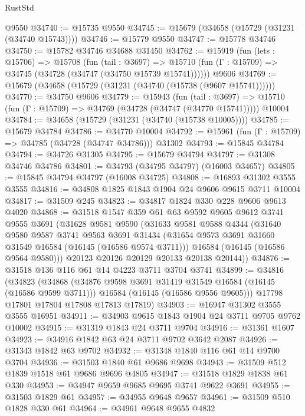 \begin{lexlean}{RustStd}
\begin{coremodule}
    @9550
@34740 := @15735 @9550
@34745 := @15679 (@34658 (@15729 (@31231 (@34740 @15743))))
@34746 := @15779 @9550
@34747 := @15778 @34746
@34750 := @15782 @34746 @34688 @31450
@34762 := @15919
    (fun (lets : @15706) =>
    @15708
      (fun (tail : @3697) =>
      @15710 (fun (Γ : @15709) => @34745 (@34728 (@34747 (@34750 @15739 @15741))))))
    @9606
@34769 := @15679 (@34658 (@15729 (@31231 (@34740 (@15738 (@9607 @15741))))))
@34770 := @34750 @9606
@34779 := @15943
    (fun (tail : @3697) => @15710 (fun (Γ : @15709) => @34769 (@34728 (@34747 (@34770 @15741)))))
    @10004
@34784 := @34658 (@15729 (@31231 (@34740 (@15738 @10005))))
@34785 := @15679 @34784
@34786 := @34770 @10004
@34792 := @15961 (fun (Γ : @15709) => @34785 (@34728 (@34747 @34786))) @31302
@34793 := @15845 @34784
@34794 := @34726 @31305
@34795 := @15679 @34794
@34797 := @31308 @34746 @34786
@34801 := @34793 (@34795 @34797) (@16003 @34657)
@34805 := @15845 @34794 @34797 (@16008 @34725)
@34808 := @16893 @31302 @3555 @3555
@34816 := @34808 @1825 @1843 @1904 @24 @9606 @9615 @3711 @10004
@34817 := @31509 @245
@34823 := @34817 @1824 @330 @228 @9606 @9613 @4020
@34868 := @31518
    @1547
    @359
    @61
    @63
    @9592
    @9605
    @9612
    @3741
    @9555
    @3691
    (@31628
      @9581
      @9590
      (@31633
        @9581
        @9588
        @4344
        (@31640
          @9580
          @9587
          @3741
          @9563
          @3691
          @31434
          (@31654 @9573 @3691 @31660 @31549 @16584 (@16145 (@16586 @9574 @3711)))
          @16584
          (@16145 (@16586 @9564 @9580)))
        @20123
        @20126
        @20129
        @20133
        @20138
        @20144))
@34876 := @31518 @136 @116 @61 @14 @4223 @3711 @3704 @3741
@34899 := @34816
    (@34823
      (@34868
        (@34876 @9598 @3691 @31419 @31549 @16584 (@16145 (@16586 @9599 @3711)))
        @16584
        (@16145 (@16586 @9556 @9605)))
      @17798
      @17801
      @17804
      @17808
      @17813
      @17819)
@34903 := @16947 @31302 @3555 @3555 @16951
@34911 := @34903 @9615 @1843 @1904 @24 @3711 @9705 @9762 @10002
@34915 := @31319 @1843 @24 @3711 @9704
@34916 := @31361 @1607
@34923 := @34916 @1842 @63 @24 @3711 @9702 @3642 @2087
@34926 := @31343 @1842 @63 @9702
@34932 := @31348 @1840 @116 @61 @14 @9700 @3704
@34936 := @31503 @1840 @61 @9686 @9698
@34943 := @31509 @512 @1839 @1518 @61 @9686 @9696 @4805
@34947 := @31518 @1829 @1838 @61 @330
@34953 := @34947 @9659 @9685 @9695 @3741 @9622 @3691
@34955 := @31503 @1829 @61
@34957 := @34955 @9648 @9657
@34961 := @31509 @510 @1828 @330 @61
@34964 := @34961 @9648 @9655 @4832

\end{coremodule}
\end{lexlean}
